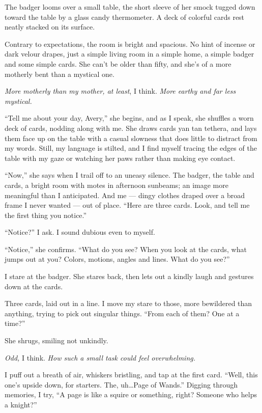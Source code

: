 The badger looms over a small table, the short sleeve of her smock
tugged down toward the table by a glass candy thermometer. A deck of
colorful cards rest neatly stacked on its surface.

Contrary to expectations, the room is bright and spacious. No hint of
incense or dark velour drapes, just a simple living room in a simple
home, a simple badger and some simple cards. She can't be older than
fifty, and she's of a more motherly bent than a mystical one.

\emph{More motherly than my mother, at least}, I think. \emph{More
earthy and far less mystical.}

``Tell me about your day, Avery,'' she begins, and as I speak, she
shuffles a worn deck of cards, nodding along with me. She draws cards
yan tan tethera, and lays them face up on the table with a casual
slowness that does little to distract from my words. Still, my language
is stilted, and I find myself tracing the edges of the table with my
gaze or watching her paws rather than making eye contact.

``Now,'' she says when I trail off to an uneasy silence. The badger, the
table and cards, a bright room with motes in afternoon sunbeams; an
image more meaningful than I anticipated. And me --- dingy clothes
draped over a broad frame I never wanted --- out of place. ``Here are
three cards. Look, and tell me the first thing you notice.''

``Notice?'' I ask. I sound dubious even to myself.

``Notice,'' she confirms. ``What do you see? When you look at the cards,
what jumps out at you? Colors, motions, angles and lines. What do you
see?''

I stare at the badger. She stares back, then lets out a kindly laugh and
gestures down at the cards.

Three cards, laid out in a line. I move my stare to those, more
bewildered than anything, trying to pick out singular things. ``From
each of them? One at a time?''

She shrugs, smiling not unkindly.

\emph{Odd,} I think. \emph{How such a small task could feel
overwhelming.}

I puff out a breath of air, whiskers bristling, and tap at the first
card. ``Well, this one's upside down, for starters. The, uh\ldots{}Page
of Wands.'' Digging through memories, I try, ``A page is like a squire
or something, right? Someone who helps a knight?''

